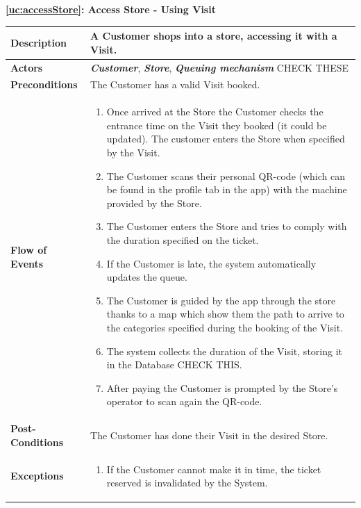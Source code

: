 \documentclass[a4paper, 10pt, oneside]{article}
\newcommand*{\lorenzo}[1]{\textcolor{BurntOrange}{#1}}
\begin{document}
\begin{center}
{\textbf{\ref{uc:accessStore}: Access Store - Using Visit}}
\end{center}
\begin{tabularx}{\linewidth}{| l | X |}
	
	\hline
	\textbf{Description} & A Customer shops into a store, accessing it with a Visit.\\
	

	\hline
	\textbf{Actors} & \textbf{\textit{Customer}}, \textit{\textbf{Store}}, \textit{\textbf{Queuing mechanism}}  \lorenzo{CHECK THESE}\\
	
	\hline
	\textbf{Preconditions} & The Customer has a valid Visit booked.\\
	
	\hline
	\textbf{Flow of Events} & \parbox{0.7\textwidth}{	
		\begin{enumerate}
			\item Once arrived at the Store the Customer checks the entrance time on the Visit they booked (it could be updated). The customer enters the Store when specified by the Visit.
			\item The Customer scans their personal QR-code (which can be found in the profile tab in the app) with the machine provided by the Store.
			\item The Customer enters the Store and tries to comply with the duration specified on the ticket.
			\item If the Customer is late, the system automatically updates the queue.
			\item The Customer is guided by the app through the store thanks to a map which show them the path to arrive to the categories specified during the booking of the Visit.
			\item The system collects the duration of the Visit, storing it in the Database \lorenzo{CHECK THIS}.
			\item After paying the Customer is prompted by the Store's operator to scan again the QR-code.
	\end{enumerate}}\\
	
	\hline
	\textbf{Post-Conditions} & The Customer has done their Visit in the desired Store.\\
	
	\hline
	\textbf{Exceptions} & \parbox{0.7\textwidth}{ \begin{enumerate}
			\item If the Customer cannot make it in time, the ticket reserved is invalidated by the System.
		\end{enumerate}}\\

	\hline
\end{tabularx}
\end{document}
